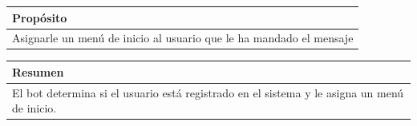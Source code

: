 \begin{table}[!ht]

\begin{tabular}{|m{10cm}|}
\hline\rowcolor{Gray}
{\bf Propósito}\\
\hline
{Asignarle un menú de inicio al usuario que le ha mandado el mensaje} \\
\hline

\end{tabular}


\end{table}

\begin{table}[!ht]

\begin{tabular}{|m{10cm}|}
\hline\rowcolor{Gray}
{\bf Resumen}\\
\hline
{El bot determina si el usuario está registrado en el sistema y le asigna un menú de inicio. } \\
\hline

\end{tabular}



\end{table}

